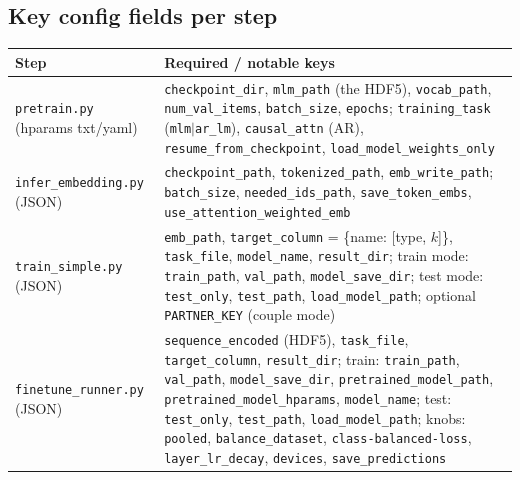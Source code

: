 \documentclass[11pt,a4paper]{article}
\newcommand{\file}[1]{\texttt{\small #1}}
\newcommand{\code}[1]{\texttt{\small #1}}
\begin{document}
\subsection{Key config fields per step}
\begin{center}\small
\begin{tabular}{@{}lp{10.6cm}@{}}
\toprule
\textbf{Step} & \textbf{Required / notable keys} \\
\midrule
\file{pretrain.py} (hparams txt/yaml) &
\code{checkpoint\_dir}, \code{mlm\_path} (the HDF5), \code{vocab\_path},
\code{num\_val\_items}, \code{batch\_size}, \code{epochs};
\code{training\_task} (\code{mlm}$|$\code{ar\_lm}), \code{causal\_attn} (AR),
\code{resume\_from\_checkpoint}, \code{load\_model\_weights\_only} \\
\addlinespace[2pt]
\file{infer\_embedding.py} (JSON) &
\code{checkpoint\_path}, \code{tokenized\_path}, \code{emb\_write\_path};
\code{batch\_size}, \code{needed\_ids\_path}, \code{save\_token\_embs},
\code{use\_attention\_weighted\_emb} \\
\addlinespace[2pt]
\file{train\_simple.py} (JSON) &
\code{emb\_path}, \code{target\_column} = \{name: [type, $k$]\},
\code{task\_file}, \code{model\_name}, \code{result\_dir};
train mode: \code{train\_path}, \code{val\_path}, \code{model\_save\_dir};
test mode: \code{test\_only}, \code{test\_path}, \code{load\_model\_path};
optional \code{PARTNER\_KEY} (couple mode) \\
\addlinespace[2pt]
\file{finetune\_runner.py} (JSON) &
\code{sequence\_encoded} (HDF5), \code{task\_file}, \code{target\_column},
\code{result\_dir}; train: \code{train\_path}, \code{val\_path},
\code{model\_save\_dir}, \code{pretrained\_model\_path},
\code{pretrained\_model\_hparams}, \code{model\_name};
test: \code{test\_only}, \code{test\_path}, \code{load\_model\_path};
knobs: \code{pooled}, \code{balance\_dataset}, \code{class-balanced-loss},
\code{layer\_lr\_decay}, \code{devices}, \code{save\_predictions} \\
\bottomrule
\end{tabular}
\end{center}

\end{document}
